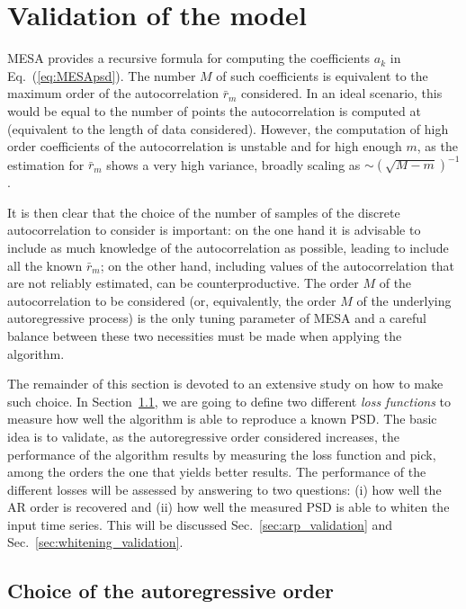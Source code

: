 \documentclass{aa}
\begin{document}
\section{Validation of the model}\label{sec:validation}

MESA provides a recursive formula for computing the coefficients $a_k$ in Eq.~(\ref{eq:MESApsd}). The number $M$ of such coefficients is equivalent to the maximum order of the autocorrelation $\bar{r}_m$ considered. In an ideal scenario, this would be equal to the number of points the autocorrelation is computed at (equivalent to the length of data considered). However, the computation of high order coefficients of the autocorrelation is unstable and for high enough $m$, as the estimation for  $\bar{r}_m$ shows a very high variance, broadly scaling as $\sim \left(\sqrt{M - m}\right)^{-1}$.

It is then clear that the choice of the number of samples of the discrete autocorrelation to consider is important: 
on the one hand it is advisable to include as much knowledge of the autocorrelation as possible, leading to include all the known $\bar{r}_m$; on the other hand, including values of the autocorrelation that are not reliably estimated, can be counterproductive.
The order $M$ of the autocorrelation to be considered (or, equivalently, the order $M$ of the underlying autoregressive process) is the only tuning parameter of MESA and a careful balance between these two necessities must be made when applying the algorithm.

The remainder of this section is devoted to an extensive study on how to make such choice.
In Section~\ref{sec:optimizers}, we are going to define two different \textit{loss functions} to measure how well the 
algorithm is able to reproduce a known PSD.
The basic idea is to validate, as the autoregressive order considered increases, the performance of the algorithm results 
by measuring the loss function and pick, among the orders the one that yields better results.
The performance of the different losses will be assessed by answering to two questions: (i) how well the AR order is recovered and (ii) how well the measured PSD is able to whiten the input time series.
This will be discussed Sec.~\ref{sec:arp_validation} and Sec.~\ref{sec:whitening_validation}.

\subsection{Choice of the autoregressive order}\label{sec:optimizers} 
\end{document}
